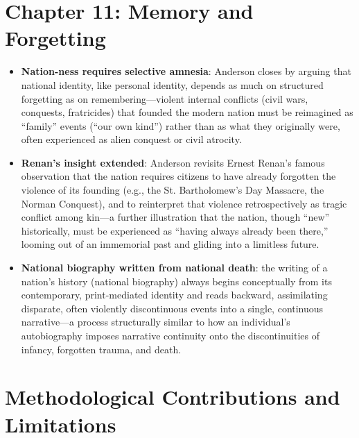 \documentclass[12pt]{article}
\begin{document}
\section{Chapter 11: Memory and Forgetting}

\begin{itemize}[leftmargin=*, itemsep=4pt]
    \item \textbf{Nation-ness requires selective amnesia}: Anderson closes by arguing that national identity, like personal identity, depends as much on structured forgetting as on remembering---violent internal conflicts (civil wars, conquests, fratricides) that founded the modern nation must be reimagined as ``family'' events (``our own kind'') rather than as what they originally were, often experienced as alien conquest or civil atrocity.
    \item \textbf{Renan's insight extended}: Anderson revisits Ernest Renan's famous observation that the nation requires citizens to have already forgotten the violence of its founding (e.g., the St. Bartholomew's Day Massacre, the Norman Conquest), and to reinterpret that violence retrospectively as tragic conflict among kin---a further illustration that the nation, though ``new'' historically, must be experienced as ``having always already been there,'' looming out of an immemorial past and gliding into a limitless future.
    \item \textbf{National biography written from national death}: the writing of a nation's history (national biography) always begins conceptually from its contemporary, print-mediated identity and reads backward, assimilating disparate, often violently discontinuous events into a single, continuous narrative---a process structurally similar to how an individual's autobiography imposes narrative continuity onto the discontinuities of infancy, forgotten trauma, and death.
\end{itemize}

\section{Methodological Contributions and Limitations}
\end{document}
